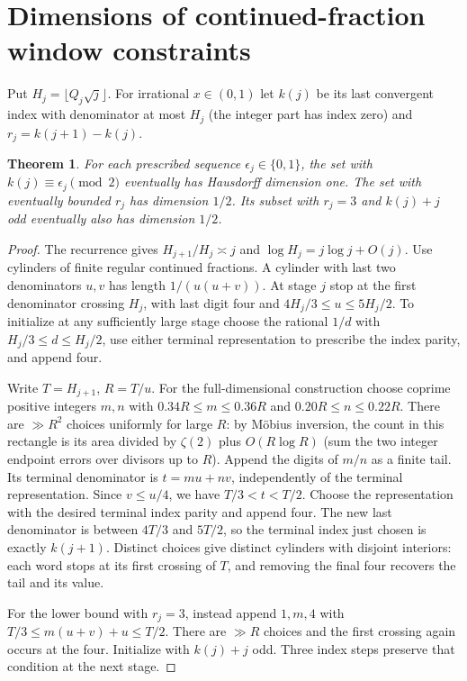 \documentclass[11pt]{article}
\newtheorem{theorem}{Theorem}
\theoremstyle{definition}
\theoremstyle{remark}
\begin{document}
\section{Dimensions of continued-fraction window constraints}
Put $H_j=\lfloor Q_j\sqrt j\rfloor$. For irrational $x\in(0,1)$ let
$k(j)$ be its last convergent index with denominator at most $H_j$
(the integer part has index zero) and $r_j=k(j+1)-k(j)$.
\begin{theorem}\label{thm:windows}
For each prescribed sequence $\epsilon_j\in\{0,1\}$, the set with
$k(j)\equiv\epsilon_j\pmod2$ eventually has Hausdorff dimension one.
The set with eventually bounded $r_j$ has dimension $1/2$. Its subset
with $r_j=3$ and $k(j)+j$ odd eventually also has dimension $1/2$.
\end{theorem}
\begin{proof}
The recurrence gives $H_{j+1}/H_j\asymp j$ and
$\log H_j=j\log j+O(j)$. Use cylinders of finite regular continued
fractions. A cylinder with last two denominators $u,v$ has length
$1/(u(u+v))$. At stage $j$ stop at the first denominator crossing $H_j$,
with last digit four and $4H_j/3\le u\le 5H_j/2$.
To initialize at any sufficiently large stage choose the rational $1/d$
with $H_j/3\le d\le H_j/2$, use either terminal representation to
prescribe the index parity, and append four.

Write $T=H_{j+1}$, $R=T/u$. For the full-dimensional construction
choose coprime positive integers $m,n$ with
$0.34R\le m\le0.36R$ and $0.20R\le n\le0.22R$.
There are $\gg R^2$ choices uniformly for large $R$: by
M\"obius inversion, the count in this rectangle is its area divided
by $\zeta(2)$ plus $O(R\log R)$ (sum the two integer endpoint errors
over divisors up to $R$). Append the digits of $m/n$ as a finite tail.
Its terminal denominator is $t=mu+nv$, independently of the terminal
representation. Since $v\le u/4$, we have $T/3<t<T/2$.
Choose the representation with the desired terminal index parity and
append four. The new last denominator is between $4T/3$ and $5T/2$,
so the terminal index just chosen is exactly $k(j+1)$.
Distinct choices give distinct cylinders with disjoint interiors:
each word stops at its first crossing of $T$, and removing the final
four recovers the tail and its value.

For the lower bound with $r_j=3$, instead append $1,m,4$ with
$T/3\le m(u+v)+u\le T/2$. There are $\gg R$ choices and the first
crossing again occurs at the four. Initialize with $k(j)+j$ odd.
Three index steps preserve that condition at the next stage.


\end{proof}
\end{document}
